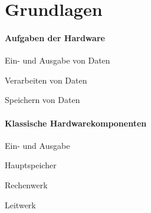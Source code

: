 \section{Grundlagen}
\label{sec:grundlagen}
  \paragraph{Aufgaben der Hardware}
  \begin{items}
    \item Ein- und Ausgabe von Daten
    \item Verarbeiten von Daten
    \item Speichern von Daten
  \end{items}

  \paragraph{Klassische Hardwarekomponenten}
  \begin{items}
    \item Ein- und Ausgabe
    \item Hauptspeicher
    \item Rechenwerk
    \item Leitwerk
  \end{items}